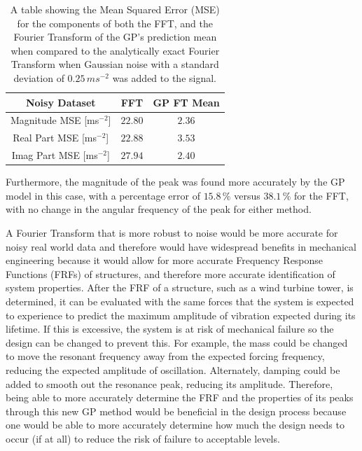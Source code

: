 \documentclass[12pt]{article}
\begin{document}
    \begin{table}[h]
        \centering %
        \setlength{\arrayrulewidth}{1pt} %
        \begin{tabular}{|c|c|c|} %
            \hline
            Noisy Dataset & FFT & GP FT Mean \\ %
            \hline
            Magnitude MSE [ms$^{-2}$] & $22.80$ & $2.36$ \\
            \hline
            Real Part MSE [ms$^{-2}$] & $22.88$ & $3.53$ \\
            \hline
            Imag Part MSE [ms$^{-2}$] & $27.94$ & $2.40$ \\
            \hline
        \end{tabular}
        \caption{A table showing the Mean Squared Error (MSE) for the components of both the FFT, and the Fourier Transform of the GP's prediction mean when compared to the analytically exact Fourier Transform when Gaussian noise with a standard deviation of $0.25 \, ms^{-2}$ was added to the signal.}
        \label{tab:response-noise}
    \end{table}

    Furthermore, the magnitude of the peak was found more accurately by the GP model in this case, with a percentage error of $15.8 \, \%$ versus $38.1 \, \%$ for the FFT, with no change in the angular frequency of the peak for either method.

    A Fourier Transform that is more robust to noise would be more accurate for noisy real world data and therefore would have widespread benefits in mechanical engineering because it would allow for more accurate Frequency Response Functions (FRFs) of structures, and therefore more accurate identification of system properties.
    After the FRF of a structure, such as a wind turbine tower, is determined, it can be evaluated with the same forces that the system is expected to experience to predict the maximum amplitude of vibration expected during its lifetime.
    If this is excessive, the system is at risk of mechanical failure so the design can be changed to prevent this.
    For example, the mass could be changed to move the resonant frequency away from the expected forcing frequency, reducing the expected amplitude of oscillation.
    Alternately, damping could be added to smooth out the resonance peak, reducing its amplitude.
    Therefore, being able to more accurately determine the FRF and the properties of its peaks through this new GP method would be beneficial in the design process because one would be able to more accurately determine how much the design needs to occur (if at all) to reduce the risk of failure to acceptable levels.
\end{document}
